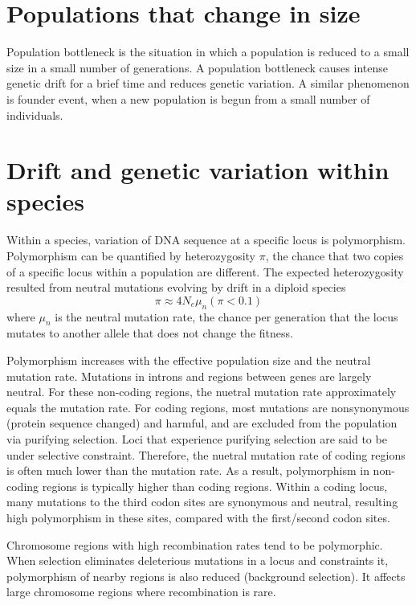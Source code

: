 \documentclass[11pt]{article}
\begin{document}
\begin{sloppypar}
\section{Populations that change in size}
Population bottleneck is the situation in which a population is reduced to a small size in a small number of generations. 
A population bottleneck causes intense genetic drift for a brief time and reduces genetic variation. 
A similar phenomenon is founder event, when a new population is begun from a small number of individuals. 

\section{Drift and genetic variation within species}
Within a species, variation of DNA sequence at a specific locus is polymorphism. 
Polymorphism can be quantified by heterozygosity $\pi$, the chance that two copies of a specific locus within a population are different. 
The expected heterozygosity resulted from neutral mutations evolving by drift in a diploid species 
\begin{equation}
    \pi \approx 4 N_e \mu_n (\pi < 0.1)
\end{equation}
where $\mu_n$ is the neutral mutation rate, the chance per generation that the locus mutates to another allele that does not change the fitness. 

\par

Polymorphism increases with the effective population size and the neutral mutation rate. 
Mutations in introns and regions between genes are largely neutral. 
For these non-coding regions, the nuetral mutation rate approximately equals the mutation rate. 
For coding regions, most mutations are nonsynonymous (protein sequence changed) and harmful, and are excluded from the population via purifying selection. 
Loci that experience purifying selection are said to be under selective constraint.
Therefore, the nuetral mutation rate of coding regions is often much lower than the mutation rate. 
As a result, polymorphism in non-coding regions is typically higher than coding regions. 
Within a coding locus, many mutations to the third codon sites are synonymous and neutral, resulting high polymorphism in these sites, compared with the first/second codon sites. 

\par

Chromosome regions with high recombination rates tend to be polymorphic.
When selection eliminates deleterious mutations in a locus and constraints it, polymorphism of nearby regions is also reduced (background selection). 
It affects large chromosome regions where recombination is rare. 



\end{sloppypar}
\end{document}
